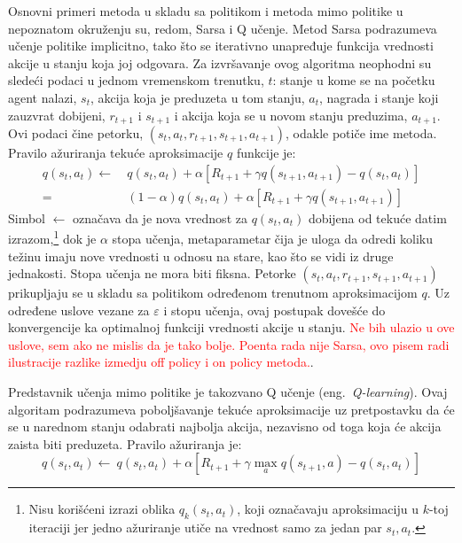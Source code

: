 \par 
Osnovni primeri metoda u skladu sa politikom i metoda mimo politike u nepoznatom okruženju su, redom, Sarsa i Q učenje. Metod Sarsa podrazumeva učenje politike implicitno, tako što se iterativno unapređuje funkcija vrednosti akcije u stanju koja joj odgovara. Za izvršavanje ovog algoritma neophodni su sledeći podaci u jednom vremenskom trenutku, $t$: stanje u kome se na početku agent nalazi, $s_t$, akcija koja je preduzeta u tom stanju, $a_t$, nagrada i stanje koji zauzvrat dobijeni, $r_{t+1}$ i $s_{t+1}$ i akcija koja se u novom stanju preduzima, $a_{t+1}$. Ovi podaci čine petorku, $(s_t, a_t, r_{t+1}, s_{t+1}, a_{t+1})$, odakle potiče ime metoda. Pravilo ažuriranja tekuće aproksimacije $q$ funkcije je:
\begin{equation}
	\begin{aligned}
		q(s_t, a_t) \leftarrow& ~q(s_t, a_t) + \alpha [ R_{t+1} + \gamma q(s_{t+1}, a_{t+1}) - q(s_t, a_t)] \\
					=&~ (1-\alpha)q(s_t, a_t) + \alpha [ R_{t+1} + \gamma q(s_{t+1}, a_{t+1}) ]
	\end{aligned}
\end{equation}
Simbol $\leftarrow$ označava da je nova vrednost za $q(s_t, a_t)$ dobijena od tekuće datim izrazom,\footnote{Nisu korišćeni izrazi oblika $q_k(s_t, a_t)$, koji označavaju aproksimaciju u $k$-toj iteraciji jer jedno ažuriranje utiče na vrednost samo za jedan par $s_t, a_t$.} dok je $\alpha$ stopa učenja, metaparametar čija je uloga da odredi koliku težinu imaju nove vrednosti u odnosu na stare, kao što se vidi iz druge jednakosti. Stopa učenja ne mora biti fiksna.
Petorke $(s_t, a_t, r_{t+1}, s_{t+1}, a_{t+1})$ prikupljaju se u skladu sa politikom određenom trenutnom aproksimacijom $q$. Uz određene uslove vezane za $\varepsilon$ i stopu učenja, ovaj postupak dovešće do konvergencije ka optimalnoj funkciji vrednosti akcije u stanju. \textcolor{red}{Ne bih ulazio u ove uslove, sem ako ne mislis da je tako bolje. Poenta rada nije Sarsa, ovo pisem radi ilustracije razlike izmedju off policy i on policy metoda.}.
\par 
Predstavnik učenja mimo politike je takozvano Q učenje (eng.~{\em Q-learning}). Ovaj algoritam podrazumeva poboljšavanje tekuće aproksimacije uz pretpostavku da će se u narednom stanju odabrati najbolja akcija, nezavisno od toga koja će akcija zaista biti preduzeta. Pravilo ažuriranja je:
\begin{equation}
	\label{eq:q_ucenje}
		q(s_t, a_t) \leftarrow ~q(s_t, a_t) + \alpha [ R_{t+1} + \gamma \max_a q(s_{t+1}, a) - q(s_t, a_t)]
\end{equation}
